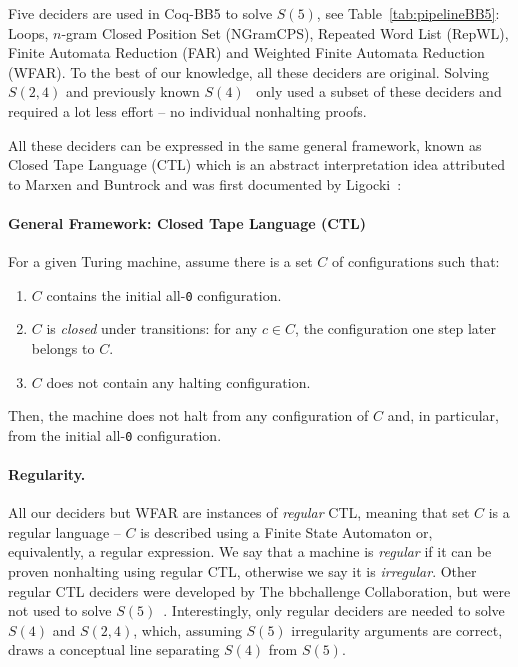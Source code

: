 \documentclass[sigconf,screen]{acmart}
\theoremstyle{definition} %
\numberwithin{equation}{section}
\theoremstyle{definition} %
\newcommand{\szero}{\texttt{0}\xspace}
\newcommand{\CoqBB}{Coq-BB5\xspace}
\begin{document}
Five deciders are used in \CoqBB to solve $S(5)$, see Table~\ref{tab:pipelineBB5}: Loops, $n$-gram Closed Position Set (NGramCPS), Repeated Word List (RepWL), Finite Automata Reduction (FAR) and Weighted Finite Automata Reduction (WFAR). To the best of our knowledge, all these deciders are original. Solving $S(2,4)$ and previously known $S(4)$~\cite{Brady83} only used a subset of these deciders and required a lot less effort -- \eg no individual nonhalting proofs.

All these deciders can be expressed in the same general framework, known as Closed Tape Language (CTL) which is an abstract interpretation idea attributed to Marxen and Buntrock and was first documented by Ligocki~\cite{ShawnCTL}:

\paragraph{General Framework: Closed Tape Language (CTL)} For a given Turing machine, assume there is a set $C$ of configurations such that:
\begin{enumerate}
    \item $C$ contains the initial all-\szero configuration.
    \item $C$ is \textit{closed} under transitions: for any $c \in C$, the configuration one step later belongs to $C$.
    \item $C$ does not contain any halting configuration.
\end{enumerate}
Then, the machine does not halt from any configuration of $C$ and, in particular, from the initial all-\szero configuration.

\paragraph{Regularity.} All our deciders but WFAR are instances of \textit{regular} CTL, meaning that set $C$ is a regular language -- \ie $C$ is described using a Finite State Automaton or, equivalently, a regular expression. We say that a machine is \textit{regular} if it can be proven nonhalting using regular CTL, otherwise we say it is \textit{irregular}. Other regular CTL deciders were developed by The bbchallenge Collaboration, but were not used to solve $S(5)$~\cite{BruteforceCTL,SymbolicTM,regexy,bbchallenge_part1}. Interestingly, only regular deciders are needed to solve $S(4)$ and $S(2,4)$, which, assuming $S(5)$ irregularity arguments are correct, draws a conceptual line separating $S(4)$ from $S(5)$.
\end{document}
